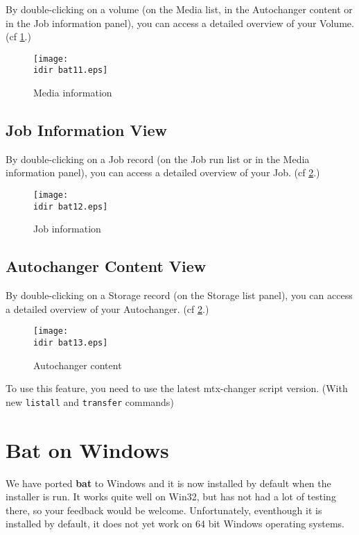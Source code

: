 By double-clicking on a volume (on the Media list, in the Autochanger content
or in the Job information panel), you can access a detailed overview of your
Volume. (cf \ref{fig:mediainfo}.)
\begin{figure}[htbp]
  \centering
  \texttt{[image: \\idir bat11.eps]}  
  \caption{Media information}
  \label{fig:mediainfo}
\end{figure}

\subsection{Job Information View}

By double-clicking on a Job record (on the Job run list or in the Media
information panel), you can access a detailed overview of your Job. (cf
\ref{fig:jobinfo}.)
\begin{figure}[htbp]
  \centering
  \texttt{[image: \\idir bat12.eps]}  
  \caption{Job information}
  \label{fig:jobinfo}
\end{figure}

\subsection{Autochanger Content View}

By double-clicking on a Storage record (on the Storage list panel), you can
access a detailed overview of your Autochanger. (cf \ref{fig:jobinfo}.)
\begin{figure}[htbp]
  \centering
  \texttt{[image: \\idir bat13.eps]}  
  \caption{Autochanger content}
  \label{fig:achcontent}
\end{figure}

To use this feature, you need to use the latest mtx-changer script
version. (With new \texttt{listall} and \texttt{transfer} commands)

\section{Bat on Windows}
We have ported {\bf bat} to Windows and it is now installed 
by default when the installer is run.  It works quite well 
on Win32, but has not had a lot of testing there, so your
feedback would be welcome.  Unfortunately, eventhough it is
installed by default, it does not yet work on 64 bit Windows
operating systems.

